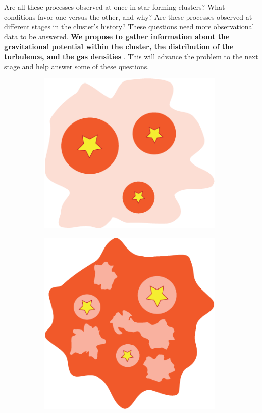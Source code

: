 Are all these processes observed at once in star forming clusters? What conditions favor one versus the other, and why? Are these processes observed at different stages in the cluster's history? These questions need more observational data to be answered. \textbf{We propose to gather information about the gravitational potential within the cluster, the distribution of the turbulence, and the gas densities} \citep{Bonnell:2006ee}. This will advance the problem to the next stage and help answer some of these questions.


\begin{figure}[ht!]
\begin{center}
\begin{subfigure}[b]{0.3\textwidth}
\centering
\includegraphics[width=0.98\textwidth]{Figures/CC.png} 
\caption{}
\label{subfig:scenarios:a}
\end{subfigure}
\begin{subfigure}[b]{0.3\textwidth}
\centering
\includegraphics[width=0.98\textwidth]{Figures/CA.png} 

\end{subfigure}
\end{center}
\end{figure}
